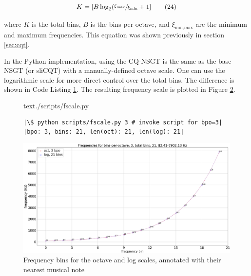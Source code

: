 \documentclass[report.tex]{subfiles}
\begin{document}
\begin{align}
	K = [B \log_{2}(\sfrac{\xi_{\text{max}}}{\xi_{\text{min}}} + 1]\tag{24}\label{equation:bpo1}
\end{align}

where $K$ is the total bins, $B$ is the bins-per-octave, and $\xi_{\text{min,max}}$ are the minimum and maximum frequencies. This equation was shown previously in section \ref{sec:cqt}.

In the Python implementation, using the CQ-NSGT is the same as the base NSGT (or sliCQT) with a manually-defined octave scale. One can use the logarithmic scale for more direct control over the total bins. The difference is shown in Code Listing \ref{code:octvlog}. The resulting frequency scale is plotted in Figure \ref{fig:octvlog}.

\begin{figure}[h]
  \centering
 \begin{minipage}{\textwidth}
  \centering
\setlength\partopsep{-\topsep}
\begin{inputminted}[linenos,breaklines,frame=single,firstline=4,lastline=16,fontsize=\scriptsize]{text}{./scripts/fscale.py}
\end{inputminted}
 \vspace{1em}
 \end{minipage}
 \begin{minipage}{\textwidth}
  \centering
\begin{verbatim}
|\$ python scripts/fscale.py 3 # invoke script for bpo=3|
|bpo: 3, bins: 21, len(oct): 21, len(log): 21|
\end{verbatim}
 \end{minipage}
  \label{code:octvlog}
\end{figure}

\begin{figure}[ht]
	\centering
	\includegraphics[width=\textwidth]{./images-freqscales/log_vs_oct.png}
	\caption{Frequency bins for the octave and log scales, annotated with their nearest musical note}
	\label{fig:octvlog}
\end{figure}
\end{document}
